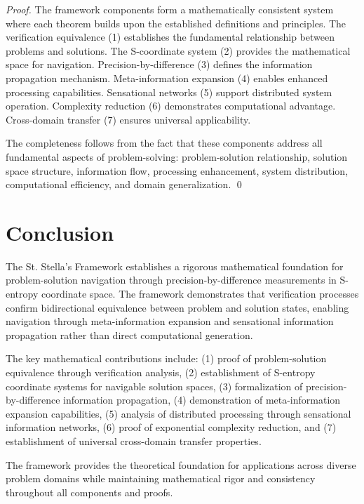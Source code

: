 \documentclass[12pt,a4paper]{article}
\begin{document}
\begin{proof}
The framework components form a mathematically consistent system where each theorem builds upon the established definitions and principles. The verification equivalence (1) establishes the fundamental relationship between problems and solutions. The S-coordinate system (2) provides the mathematical space for navigation. Precision-by-difference (3) defines the information propagation mechanism. Meta-information expansion (4) enables enhanced processing capabilities. Sensational networks (5) support distributed system operation. Complexity reduction (6) demonstrates computational advantage. Cross-domain transfer (7) ensures universal applicability.

The completeness follows from the fact that these components address all fundamental aspects of problem-solving: problem-solution relationship, solution space structure, information flow, processing enhancement, system distribution, computational efficiency, and domain generalization. \qed
\end{proof}

\section{Conclusion}

The St. Stella's Framework establishes a rigorous mathematical foundation for problem-solution navigation through precision-by-difference measurements in S-entropy coordinate space. The framework demonstrates that verification processes confirm bidirectional equivalence between problem and solution states, enabling navigation through meta-information expansion and sensational information propagation rather than direct computational generation.

The key mathematical contributions include: (1) proof of problem-solution equivalence through verification analysis, (2) establishment of S-entropy coordinate systems for navigable solution spaces, (3) formalization of precision-by-difference information propagation, (4) demonstration of meta-information expansion capabilities, (5) analysis of distributed processing through sensational information networks, (6) proof of exponential complexity reduction, and (7) establishment of universal cross-domain transfer properties.

The framework provides the theoretical foundation for applications across diverse problem domains while maintaining mathematical rigor and consistency throughout all components and proofs.
\end{document}
